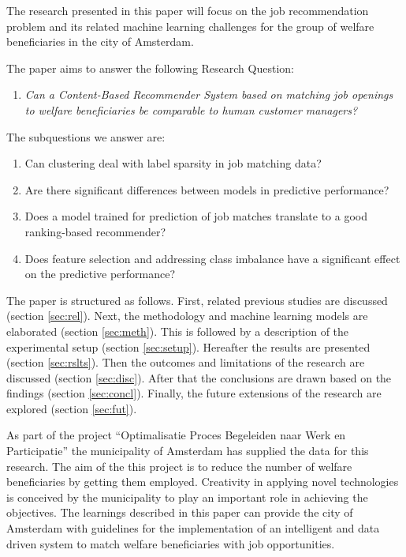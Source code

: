 The research presented in this paper will focus on the job recommendation problem and its related machine learning challenges for the group of welfare beneficiaries in the city of Amsterdam. 

The paper aims to answer the following Research Question:
\begin{enumerate}
    \item \em Can a Content-Based Recommender System based on matching job openings to welfare beneficiaries be comparable to human customer managers? \label{rq:mrq}
\end{enumerate}{}

The subquestions we answer are:
\begin{enumerate}\addtocounter{enumi}{1}
    \item Can clustering deal with label sparsity in job matching data? \label{rq:cold}
    \item Are there significant differences between models in predictive performance? \label{rq:model}
    \item Does a model trained for prediction of job matches translate to a good ranking-based recommender? \label{rq:ranking}
    \item Does feature selection and addressing class imbalance have a significant effect on the predictive performance? \label{rq:strategies}
\end{enumerate}

The paper is structured as follows. First, related previous studies are discussed (section \ref{sec:rel}). Next, the methodology and machine learning models are elaborated (section \ref{sec:meth}). This is followed by a description of the experimental setup (section \ref{sec:setup}). Hereafter the results are presented (section \ref{sec:rslts}). Then the outcomes and limitations of the research are discussed (section \ref{sec:disc}). After that the conclusions are drawn based on the findings (section \ref{sec:concl}). Finally, the future extensions of the research are explored (section \ref{sec:fut}).

As part of the project “Optimalisatie Proces Begeleiden naar Werk en Participatie” the municipality of Amsterdam has supplied the data for this research. 
The aim of the this project is to reduce the number of welfare beneficiaries by getting them employed.
Creativity in applying novel technologies is conceived by the municipality to play an important role in achieving the objectives.
The learnings described in this paper can provide the city of Amsterdam with guidelines for the implementation of an intelligent and data driven system to match welfare beneficiaries with job opportunities. 



